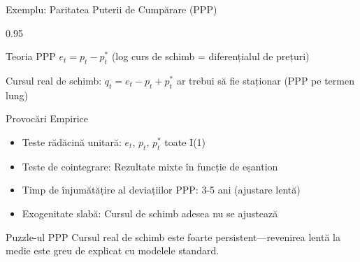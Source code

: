 \documentclass[9pt, aspectratio=169, t]{beamer}
\begin{document}
\begin{frame}{Exemplu: Paritatea Puterii de Cumpărare (PPP)}
    \begin{cminipage}{0.95\textwidth}
    {\small
    \begin{block}{Teoria PPP}
        $e_t = p_t - p_t^*$ (log curs de schimb = diferențialul de prețuri)

        Cursul real de schimb: $q_t = e_t - p_t + p_t^*$ ar trebui să fie staționar (PPP pe termen lung)
    \end{block}
    \begin{exampleblock}{Provocări Empirice}
        \begin{itemize}\setlength{\itemsep}{0pt}
            \item Teste rădăcină unitară: $e_t$, $p_t$, $p_t^*$ toate I(1)
            \item Teste de cointegrare: Rezultate mixte în funcție de eșantion
            \item Timp de înjumătățire al deviațiilor PPP: 3-5 ani (ajustare lentă)
            \item Exogenitate slabă: Cursul de schimb adesea nu se ajustează
        \end{itemize}
    \end{exampleblock}
    \begin{alertblock}{Puzzle-ul PPP}
        Cursul real de schimb este foarte persistent---revenirea lentă la medie este greu de explicat cu modelele standard.
    \end{alertblock}
    }
    \end{cminipage}
\end{frame}
\end{document}
